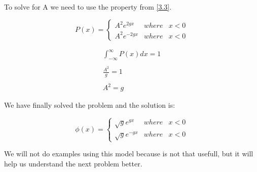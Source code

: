 To solve for A we need to use the property from \ref{3.3}.

\begin{equation}
\label{4.14}
P(x) = \left\{ \begin{array}{lcc}
     A^2e^{2gx}    & where  &  x<0  \\
     A^2e^{-2gx}   & where  &  x<0
\end{array}\right.
\end{equation}

\begin{equation}
\label{4.15}
\begin{array}{c}
     \int_{-\infty}^{\infty}P(x) dx = 1
     \\

     \\
     \frac{A^2}{g}=1
     \\

     \\
     A^2 = g
\end{array}
\end{equation}

We have finally solved the problem and the solution is:

\begin{equation}
\label{4.16}
\phi(x) = \left\{ \begin{array}{lcc}
     \sqrt{g}e^{gx}    & where  &  x<0  \\
     \sqrt{g}e^{-gx}   & where  &  x<0
\end{array}\right.
\end{equation}

We will not do examples using this model because is not that usefull, but it will help us understand the next problem better.

